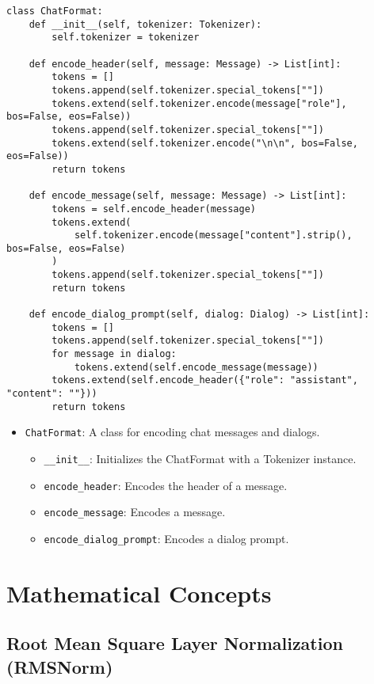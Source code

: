 \begin{lstlisting}
class ChatFormat:
    def __init__(self, tokenizer: Tokenizer):
        self.tokenizer = tokenizer

    def encode_header(self, message: Message) -> List[int]:
        tokens = []
        tokens.append(self.tokenizer.special_tokens[""])
        tokens.extend(self.tokenizer.encode(message["role"], bos=False, eos=False))
        tokens.append(self.tokenizer.special_tokens[""])
        tokens.extend(self.tokenizer.encode("\n\n", bos=False, eos=False))
        return tokens

    def encode_message(self, message: Message) -> List[int]:
        tokens = self.encode_header(message)
        tokens.extend(
            self.tokenizer.encode(message["content"].strip(), bos=False, eos=False)
        )
        tokens.append(self.tokenizer.special_tokens[""])
        return tokens

    def encode_dialog_prompt(self, dialog: Dialog) -> List[int]:
        tokens = []
        tokens.append(self.tokenizer.special_tokens[""])
        for message in dialog:
            tokens.extend(self.encode_message(message))
        tokens.extend(self.encode_header({"role": "assistant", "content": ""}))
        return tokens
\end{lstlisting}

\begin{itemize}
    \item \texttt{ChatFormat}: A class for encoding chat messages and dialogs.
    \begin{itemize}
        \item \texttt{\_\_init\_\_}: Initializes the ChatFormat with a Tokenizer instance.
        \item \texttt{encode\_header}: Encodes the header of a message.
        \item \texttt{encode\_message}: Encodes a message.
        \item \texttt{encode\_dialog\_prompt}: Encodes a dialog prompt.
    \end{itemize}
\end{itemize}

\section{Mathematical Concepts}

\subsection{Root Mean Square Layer Normalization (RMSNorm)}

